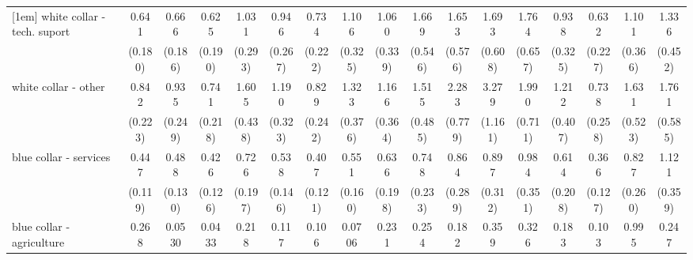 {\begin{tabular}{l*{16}{c}}
[1em]
white collar - tech. suport&       0.641         &       0.666         &       0.625         &       1.031         &       0.946         &       0.734         &       1.106         &       1.060         &       1.669         &       1.653         &       1.693         &       1.764         &       0.938         &       0.632         &       1.101         &       1.336         \\
                    &     (0.180)         &     (0.186)         &     (0.190)         &     (0.293)         &     (0.267)         &     (0.222)         &     (0.325)         &     (0.339)         &     (0.546)         &     (0.576)         &     (0.608)         &     (0.657)         &     (0.325)         &     (0.227)         &     (0.366)         &     (0.452)         \\
[1em]
white collar - other&       0.842         &       0.935         &       0.741         &       1.605         &       1.190         &       0.829         &       1.323         &       1.166         &       1.515         &       2.283\sym{*}  &       3.279\sym{***}&       1.990         &       1.212         &       0.738         &       1.631         &       1.761         \\
                    &     (0.223)         &     (0.249)         &     (0.218)         &     (0.438)         &     (0.323)         &     (0.242)         &     (0.376)         &     (0.364)         &     (0.485)         &     (0.779)         &     (1.161)         &     (0.711)         &     (0.407)         &     (0.258)         &     (0.523)         &     (0.585)         \\
[1em]
blue collar - services&       0.447\sym{**} &       0.488\sym{**} &       0.426\sym{**} &       0.726         &       0.538\sym{*}  &       0.407\sym{**} &       0.551\sym{*}  &       0.636         &       0.748         &       0.864         &       0.897         &       0.984         &       0.614         &       0.366\sym{**} &       0.827         &       1.121         \\
                    &     (0.119)         &     (0.130)         &     (0.126)         &     (0.197)         &     (0.146)         &     (0.121)         &     (0.160)         &     (0.198)         &     (0.233)         &     (0.289)         &     (0.312)         &     (0.351)         &     (0.208)         &     (0.127)         &     (0.260)         &     (0.359)         \\
[1em]
blue collar - agriculture&       0.268         &      0.0530\sym{***}&      0.0433\sym{**} &       0.218         &       0.117\sym{*}  &       0.106\sym{**} &      0.0706\sym{**} &       0.231         &       0.254         &       0.182\sym{*}  &       0.359         &       0.326         &       0.183         &       0.103\sym{**} &       0.995         &       0.247         \\

\end{tabular}}
